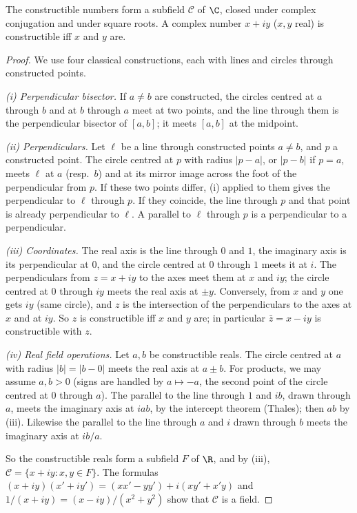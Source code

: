 \begin{proposition}\label{prop:constrfield}
The constructible numbers form a subfield $\mathcal C$ of $\C$, closed under complex conjugation and under square roots. A complex number $x+iy$ ($x,y$ real) is constructible iff $x$ and $y$ are.
\end{proposition}
\begin{proof}
We use four classical constructions, each with lines and circles through constructed points.

\emph{(i) Perpendicular bisector.} If $a\ne b$ are constructed, the circles centred at $a$ through $b$ and at $b$ through $a$ meet at two points, and the line through them is the perpendicular bisector of $[a,b]$; it meets $[a,b]$ at the midpoint.

\emph{(ii) Perpendiculars.} Let $\ell$ be a line through constructed points $a\ne b$, and $p$ a constructed point. The circle centred at $p$ with radius $|p-a|$, or $|p-b|$ if $p=a$, meets $\ell$ at $a$ (resp.\ $b$) and at its mirror image across the foot of the perpendicular from $p$. If these two points differ, (i) applied to them gives the perpendicular to $\ell$ through $p$. If they coincide, the line through $p$ and that point is already perpendicular to $\ell$. A parallel to $\ell$ through $p$ is a perpendicular to a perpendicular.

\emph{(iii) Coordinates.} The real axis is the line through $0$ and $1$, the imaginary axis is its perpendicular at $0$, and the circle centred at $0$ through $1$ meets it at $i$. The perpendiculars from $z=x+iy$ to the axes meet them at $x$ and $iy$; the circle centred at $0$ through $iy$ meets the real axis at $\pm y$. Conversely, from $x$ and $y$ one gets $iy$ (same circle), and $z$ is the intersection of the perpendiculars to the axes at $x$ and at $iy$. So $z$ is constructible iff $x$ and $y$ are; in particular $\bar z=x-iy$ is constructible with $z$.

\emph{(iv) Real field operations.} Let $a,b$ be constructible reals. The circle centred at $a$ with radius $|b|=|b-0|$ meets the real axis at $a\pm b$. For products, we may assume $a,b>0$ (signs are handled by $a\mapsto-a$, the second point of the circle centred at $0$ through $a$). The parallel to the line through $1$ and $ib$, drawn through $a$, meets the imaginary axis at $iab$, by the intercept theorem (Thales); then $ab$ by (iii). Likewise the parallel to the line through $a$ and $i$ drawn through $b$ meets the imaginary axis at $ib/a$.

So the constructible reals form a subfield $F$ of $\R$, and by (iii), $\mathcal C=\{x+iy:x,y\in F\}$. The formulas $(x+iy)(x'+iy')=(xx'-yy')+i(xy'+x'y)$ and $1/(x+iy)=(x-iy)/(x^2+y^2)$ show that $\mathcal C$ is a field.


\end{proof}
